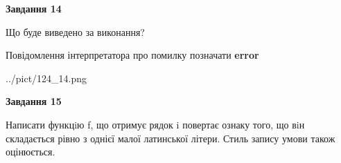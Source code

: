 \documentclass[11pt, ukrainian]{article}
\begin{document}
{\begin {large}
{\begin {center}\textbf{Завдання 14}\end {center}}\par
Що буде виведено за виконання? \par
Повідомлення інтерпретатора про помилку позначати \textbf{error}

\begin{center}
	{../pict/124_14.png}
\end{center}
\newpage

{\begin {center}\textbf{Завдання 15}\end {center}}\par

Написати функцiю f, що отримує рядок i повертає ознаку того, що вiн складається рівно з однієї малої латинської літери. Стиль запису умови також оцінюється.\par
\newpage

\end {large}}
\end{document}
